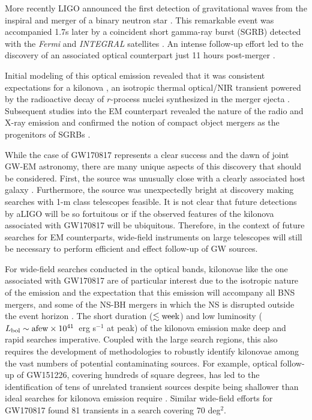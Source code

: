 More recently LIGO announced the first detection of gravitational waves from the inspiral and merger of a binary neutron star \citep[GW170817][]{LIGOGW170817}. This remarkable event was accompanied 1.7s later by a coincident short gamma-ray burst (SGRB) detected with the {\it Fermi} and {\it INTEGRAL} satellites \citep{LIGOGW170817grb,GW170817Fermi,Savchenko+17}. An intense follow-up effort led to the discovery of an associated optical counterpart just 11 hours post-merger \citep{LIGOMMAPaper,Arcavi+17,Coulter+17,GW170817DECam,Valenti+17}.

Initial modeling of this optical emission revealed that it was consistent expectations for a kilonova \citep{Cowp+17,Kilpatrick+17,Tanaka+17,Villar+17b, Tanaka+18}, an isotropic thermal optical/NIR transient powered by the radioactive decay of $r$-process nuclei synthesized in the merger ejecta \citep[see e.g.,][]{Metzger+10,Kasen+13,BarnesKasen13,Metzger2017}. Subsequent studies into the EM counterpart revealed the nature of the radio and X-ray emission \citep{Alexander+17,Davanzo+18,Margutti+17,Margutti+18,Mooley+18,Troja+17} and confirmed the notion of compact object mergers as the progenitors of SGRBs \citep{Fong+13, Berger2014, Fong+15, Fong+17}.

While the case of GW170817 represents a clear success and the dawn of joint GW-EM astronomy, there are many unique aspects of this discovery that should be considered. First, the source was unusually close \citep[$D \approx 40$~Mpc,][]{LIGOGW170817} with a clearly associated host galaxy \citep[NGC 4993,][]{Blanchard+17,Cantiello+18}. Furthermore, the source was unexpectedly bright at discovery \citep[$m_i \approx 17.5$~mag,][]{LIGOMMAPaper,Arcavi+17,Coulter+17,GW170817DECam,Valenti+17} making searches with 1-m class telescopes feasible. It is not clear that future detections by aLIGO will be so fortuitous or if the observed features of the kilonova associated with GW170817 will be ubiquitous. Therefore, in the context of future searches for EM counterparts, wide-field instruments on large telescopes will still be necessary to perform efficient and effect follow-up of GW sources.

For wide-field searches conducted in the optical bands, kilonovae like the one associated with GW170817 are of particular interest due to the isotropic nature of the emission and the expectation that this emission will accompany all BNS mergers, and some of the NS-BH mergers in which the NS is disrupted outside the event horizon \citep{MetzgerBerger12}. The short duration ($\lesssim {\rm week}$) and low luminosity ($L_{\rm bol} \sim {\rm a few} \times 10^{41}$~erg s$^{-1}$ at peak) of the kilonova emission make deep and rapid searches imperative. Coupled with the large search regions, this also requires the development of methodologies to robustly identify kilonovae among the vast numbers of potential contaminating sources. For example, optical follow-up of GW151226, covering hundreds of square degrees, has led to the identification of tens of unrelated transient sources despite being shallower than ideal searches for kilonova emission require \citep[e.g.,][]{GW151226PS1}. Similar wide-field efforts for GW170817 \citep[e.g., DECam][]{GW170817DECam} found 81 transients in a search covering 70 deg$^2$.

